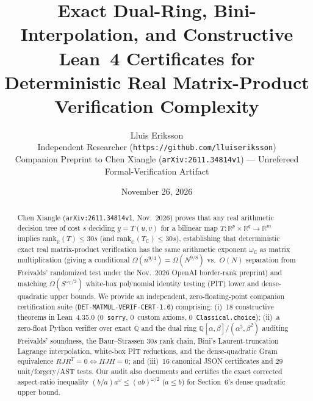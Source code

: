 \documentclass[10pt,twocolumn]{article}
\title{\vspace{-1.2em}\textbf{Exact Dual-Ring, Bini-Interpolation, and Constructive Lean~4 Certificates for Deterministic Real Matrix-Product Verification Complexity}\vspace{-0.4em}}
\author{Lluis Eriksson\\
\small Independent Researcher (\nolinkurl{https://github.com/lluiseriksson})\\
\small Companion Preprint to Chen Xiangle (\texttt{arXiv:2611.34814v1}) --- Unrefereed Formal-Verification Artifact\vspace{-0.6em}}
\date{November 26, 2026}
\begin{document}
\maketitle

\begin{abstract}
\noindent Chen Xiangle (\texttt{arXiv:2611.34814v1}, Nov.~2026) proves that any real arithmetic decision tree of cost $s$ deciding $y = T(u,v)$ for a bilinear map $T:\mathbb{R}^p\times\mathbb{R}^q \to \mathbb{R}^m$ implies $\underline{\mathrm{rank}}_{\mathbb{R}}(T) \le 30s$ (and $\underline{\mathrm{rank}}_{\mathbb{C}}(T_{\mathbb{C}}) \le 30s$), establishing that deterministic exact real matrix-product verification has the same arithmetic exponent $\omega_{\mathbb{C}}$ as matrix multiplication (giving a conditional $\Omega(n^{9/4}) = \Omega(N^{9/8})$ vs.\ $O(N)$ separation from Freivalds' randomized test under the Nov.~2026 OpenAI border-rank preprint) and matching $\Omega(S^{\omega_{\mathbb{C}}/2})$ white-box polynomial identity testing (PIT) lower and dense-quadratic upper bounds. We provide an independent, zero-floating-point companion certification suite (\texttt{DET-MATMUL-VERIF-CERT-1.0}) comprising: (i)~18 constructive theorems in Lean~4.35.0 (0~\texttt{sorry}, 0~custom axioms, 0~\texttt{Classical.choice}); (ii)~a zero-float Python verifier over exact $\mathbb{Q}$ and the dual ring $\mathbb{Q}[\alpha,\beta]/(\alpha^2,\beta^2)$ auditing Freivalds' soundness, the Baur--Strassen $30s$ rank chain, Bini's Laurent-truncation Lagrange interpolation, white-box PIT reductions, and the dense-quadratic Gram equivalence $RJR^T=0 \iff HJH=0$; and (iii)~16 canonical JSON certificates and 29 unit/forgery/AST tests. Our audit also documents and certifies the exact corrected aspect-ratio inequality $(b/a)a^\omega \le (ab)^{\omega/2}$ ($a\le b$) for Section~6's dense quadratic upper bound.
\end{abstract}
\end{document}
